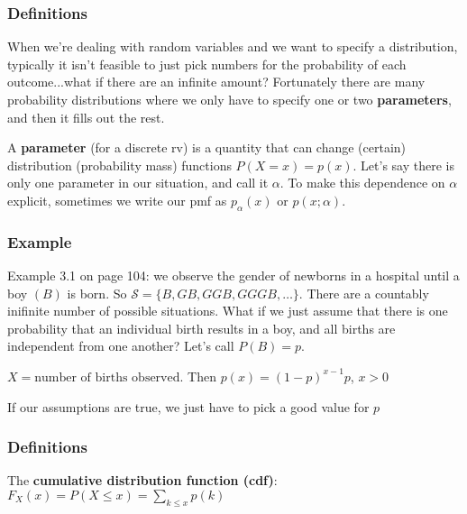 \documentclass{beamer}
\begin{document}
\begin{frame}
\frametitle{Definitions}

When we're dealing with random variables and we want to specify a distribution, typically it isn't feasible to just pick numbers for the probability of each outcome...what if there are an infinite amount? Fortunately there are many probability distributions where we only have to specify one or two \textbf{parameters}, and then it fills out the rest. 
\newline

A \textbf{parameter} (for a discrete rv) is a quantity that can change (certain) distribution (probability mass) functions $P(X=x) = p(x)$. Let's say there is only one parameter in our situation, and call it $\alpha$. To make this dependence on $\alpha$ explicit, sometimes we write our pmf as $p_{\alpha}(x)$ or $p(x;\alpha)$.


\end{frame}

\begin{frame}
\frametitle{Example}

Example 3.1 on page 104: we observe the gender of newborns in a hospital until a boy $(B)$ is born. So $\mathcal{S} = \{B, GB, GGB, GGGB, \ldots\}$. There are a countably inifinite number of possible situations. What if we just assume that there is one probability that an individual birth results in a boy, and all births are independent from one another? Let's call $P(B) = p$. 
\newline

$X = \text{number of births observed}$. Then $p(x) = (1-p)^{x-1}p$, $x > 0$
\newline

If our assumptions are true, we just have to pick a good value for $p$


\end{frame}

\begin{frame}
\frametitle{Definitions}

The \textbf{cumulative distribution function (cdf)}: $F_X(x) = P(X \le x) = \sum_{k \le x} p(k)$

\end{frame}
\end{document}
